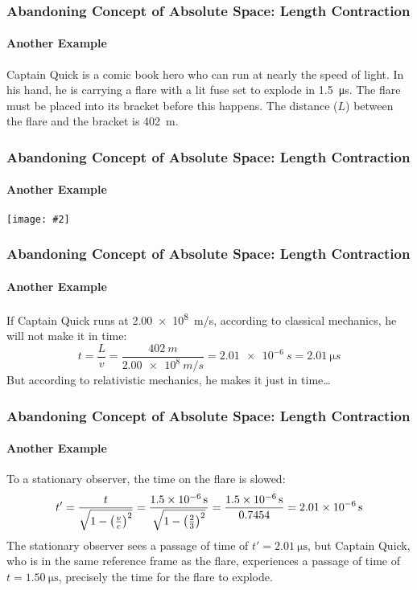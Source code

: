 \documentclass[12pt,compress,aspectratio=169]{beamer}
\newcommand{\pic}[2]{\texttt{[image: \#2]}}
\newcommand{\bigsqrt}{\ensuremath\sqrt{1-\left(\frac{v}{c}\right)^2}}
\begin{document}
\begin{frame}
  \frametitle{Abandoning Concept of Absolute Space: Length Contraction}
  \framesubtitle{Another Example}
  Captain Quick is a comic book hero who can run at nearly the speed of light.
  In his hand, he is carrying a flare with a lit fuse set to explode in
  \SI{1.5}{\micro\second}. The flare must be placed into its bracket before this
  happens. The distance ($L$) between the flare and the bracket is
  \SI{402}{\metre}.
\end{frame}

\begin{frame}
  \frametitle{Abandoning Concept of Absolute Space: Length Contraction}
  \framesubtitle{Another Example}
  \begin{center}
    \pic{0.85}{graphics/captain-quick.png}
  \end{center}
\end{frame}


\begin{frame}
  \frametitle{Abandoning Concept of Absolute Space: Length Contraction}
  \framesubtitle{Another Example}
  If Captain Quick runs at \SI{2.00e8}{m/s}, according to classical mechanics,
  he will not make it in time:
  \begin{displaymath}
    t= \frac{L}{v}=\frac{\SI{402}{m}}{\SI{2.00e8}{m/s}}
    =\SI{2.01e-6}{s}=\SI{2.01}{\micro s}
  \end{displaymath}
  But according to relativistic mechanics, he makes it just in time\ldots
\end{frame}

\begin{frame}
  \frametitle{Abandoning Concept of Absolute Space: Length Contraction}
  \framesubtitle{Another Example}
  To a stationary observer, the time on the flare is slowed:
  \begin{displaymath}
    t'
    = \frac{t}{\bigsqrt}
    = \frac{\SI{1.5e-6}{s}}{\sqrt{1-\left(\frac{2}{3}\right)^2}}
    = \frac{\SI{1.5e-6}{s}}{0.7454}
    = \SI{2.01e-6}{s}
  \end{displaymath}
  The stationary observer sees a passage of time of
  $t'=\SI{2.01}{\micro\second}$, but
  Captain Quick, who is in the same reference frame as the flare, experiences
  a passage of time of $t=\SI{1.50}{\micro\second}$, precisely the
  time for the flare to explode.
\end{frame}
\end{document}
